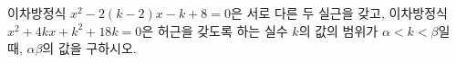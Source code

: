 이차방정식 $x^2-2(k-2)x-k+8=0$은 서로 다른 두 실근을 갖고, 이차방정식 $x^2+4kx+k^2+18k=0$은 허근을 갖도록 하는 실수 $k$의 값의 범위가 $\alpha<k<\beta$일 때, $\alpha\beta$의 값을 구하시오.
